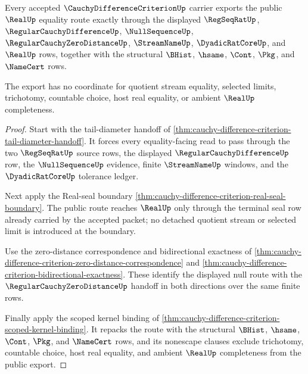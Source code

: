 \begin{theorem}
\label{thm:cauchy-difference-criterion-public-export}
Every accepted $\CauchyDifferenceCriterionUp$ carrier exports the public $\RealUp$ equality route exactly through the displayed $\RegSeqRatUp$, $\RegularCauchyDifferenceUp$, $\NullSequenceUp$, $\RegularCauchyZeroDistanceUp$, $\StreamNameUp$, $\DyadicRatCoreUp$, and $\RealUp$ rows, together with the structural $\BHist$, $\hsame$, $\Cont$, $\Pkg$, and $\NameCert$ rows.

The export has no coordinate for quotient stream equality, selected limits, trichotomy, countable choice, host real equality, or ambient $\RealUp$ completeness.
\end{theorem}
\begin{proof}
Start with the tail-diameter handoff of \autoref{thm:cauchy-difference-criterion-tail-diameter-handoff}. It forces every equality-facing read to pass through the two $\RegSeqRatUp$ source rows, the displayed $\RegularCauchyDifferenceUp$ row, the $\NullSequenceUp$ evidence, finite $\StreamNameUp$ windows, and the $\DyadicRatCoreUp$ tolerance ledger.

Next apply the Real-seal boundary \autoref{thm:cauchy-difference-criterion-real-seal-boundary}. The public route reaches $\RealUp$ only through the terminal seal row already carried by the accepted packet; no detached quotient stream or selected limit is introduced at the boundary.

Use the zero-distance correspondence and bidirectional exactness of \autoref{thm:cauchy-difference-criterion-zero-distance-correspondence} and \autoref{thm:cauchy-difference-criterion-bidirectional-exactness}. These identify the displayed null route with the $\RegularCauchyZeroDistanceUp$ handoff in both directions over the same finite rows.

Finally apply the scoped kernel binding of \autoref{thm:cauchy-difference-criterion-scoped-kernel-binding}. It repacks the route with the structural $\BHist$, $\hsame$, $\Cont$, $\Pkg$, and $\NameCert$ rows, and its nonescape clauses exclude trichotomy, countable choice, host real equality, and ambient $\RealUp$ completeness from the public export.
\end{proof}

